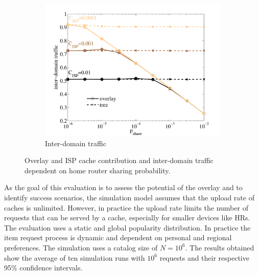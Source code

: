\begin{figure}[tb]
\begin{subfigure}[t]{0.32\textwidth}
\includegraphics[width=\textwidth]{hierarchical/simulative/figures/overlay_interdomain}
\caption{Inter-domain traffic}
\label{fig:overlay_interdomain}
\end{subfigure}
\caption{Overlay and ISP cache contribution and inter-domain traffic dependent on home router sharing probability.}
\end{figure}

As the goal of this evaluation is to assess the potential of the overlay and to identify success scenarios, the simulation model assumes that the upload rate of caches is unlimited. However, in practice the upload rate limits the number of requests that can be served by a cache, especially for smaller devices like HRs. The evaluation uses a static and global popularity distribution. In practice the item request process is dynamic and dependent on personal and regional preferences.
The simulation uses a catalog size of $N=10^6$. The results obtained show the average of ten simulation runs with $10^6$ requests and their respective 95\% confidence intervals.

